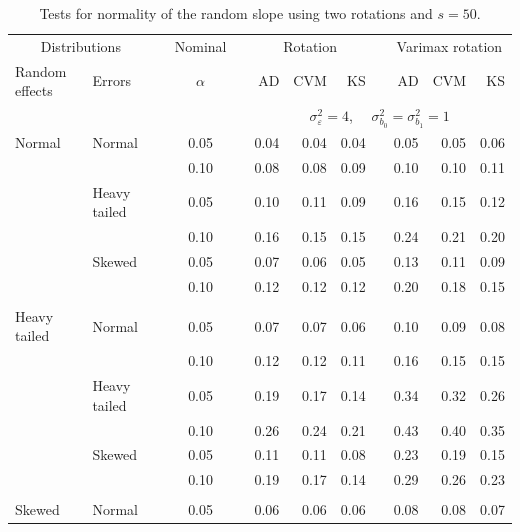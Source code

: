 \documentclass[12pt]{article} %
\begin{document}
\begin{table}[ht]
\caption{Tests for normality of the random slope using two rotations and $s = 50$.}
\begin{scriptsize}
\begin{center}
\begin{tabular}{ll p{.1cm} c p{.1cm} rrr p{.1cm} rrr}
  \hline
  \multicolumn{2}{c}{Distributions}& & Nominal & &  \multicolumn{3}{c}{Rotation} & & \multicolumn{3}{c}{Varimax rotation} \\ \cline{1-2} \cline{6-8} \cline{10-12}   
  Random effects & Errors & & $\alpha$ & & AD & CVM & KS & & AD & CVM & KS \\ 
   \hline
& && && \multicolumn{7}{c}{$\sigma_{\varepsilon}^2 = 4$, \ \ $\sigma_{b_0}^2 = \sigma_{b_1}^2 = 1$} \\ \cline{6-12}
\rowcolor{gray!20}Normal       & Normal       && 0.05 &&  0.04 & 0.04 & 0.04 && 0.05 & 0.05 & 0.06 \\ 
\rowcolor{gray!20}             &              && 0.10 &&  0.08 & 0.08 & 0.09 && 0.10 & 0.10 & 0.11 \\ 
\rowcolor{gray!20}             & Heavy tailed && 0.05 &&  0.10 & 0.11 & 0.09 && 0.16 & 0.15 & 0.12 \\ 
\rowcolor{gray!20}             &              && 0.10 &&  0.16 & 0.15 & 0.15 && 0.24 & 0.21 & 0.20 \\ 
\rowcolor{gray!20}             & Skewed       && 0.05 &&  0.07 & 0.06 & 0.05 && 0.13 & 0.11 & 0.09 \\ 
\rowcolor{gray!20}             &              && 0.10 &&  0.12 & 0.12 & 0.12 && 0.20 & 0.18 & 0.15 \\ 
             &&&&&&&&&&&\\
Heavy tailed & Normal       && 0.05 &&  0.07 & 0.07 & 0.06 && 0.10 & 0.09 & 0.08 \\ 
             &              && 0.10 &&  0.12 & 0.12 & 0.11 && 0.16 & 0.15 & 0.15 \\ 
             & Heavy tailed && 0.05 &&  0.19 & 0.17 & 0.14 && 0.34 & 0.32 & 0.26 \\ 
             &              && 0.10 &&  0.26 & 0.24 & 0.21 && 0.43 & 0.40 & 0.35 \\ 
             & Skewed       && 0.05 &&  0.11 & 0.11 & 0.08 && 0.23 & 0.19 & 0.15 \\ 
             &              && 0.10 &&  0.19 & 0.17 & 0.14 && 0.29 & 0.26 & 0.23 \\ 
             &&&&&&&&&&&\\
Skewed       & Normal       && 0.05 &&  0.06 & 0.06 & 0.06 && 0.08 & 0.08 & 0.07 \\ 

\end{tabular}
\end{center}
\end{scriptsize}
\end{table}
\end{document}
